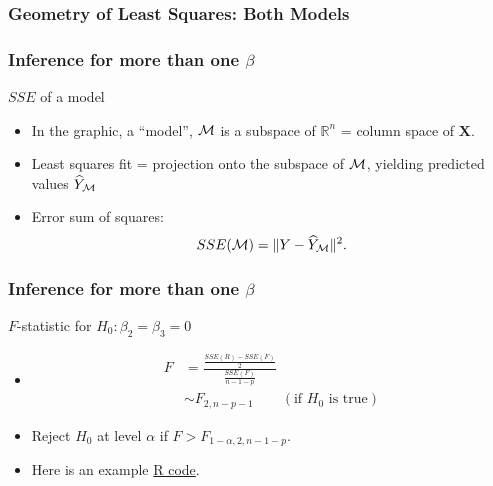 \documentclass[handout]{beamer}
\begin{document}

   \begin{frame} \frametitle{Geometry of Least Squares: Both Models}

   \end{frame}


   \begin{frame} \frametitle{Inference for more than one $\beta$}

   \begin{block}
   {$SSE$ of a model}
   \begin{itemize}[<+->]
   \item In the graphic, a ``model'', ${\cal M}$ is a subspace of $\mathbb{R}^n$ = column space of $\pmb{X}$.


   \item Least squares fit = projection onto the subspace of ${\cal M}$,
   yielding predicted values $\widehat{Y}_{{\cal M}}$

   \item Error sum of squares:
   $$
   SSE({\cal M}) = \|Y - \widehat{Y}_{{\cal M}}\|^2.
   $$
   \end{itemize}
   \end{block}
   \end{frame}


   \begin{frame} \frametitle{Inference for more than one $\beta$}

   \begin{block}
   {$F$-statistic for $H_0:\beta_2=\beta_3=0$}
   \begin{itemize}
   \item
   \begin{equation}
   \begin{aligned}
   F &=\frac{\frac{SSE(R) - SSE(F)}{2}}{\frac{SSE(F)}{n-1-p}} \\
   & \sim F_{2, n-p-1}       \qquad   (\text{if $H_0$ is true})
   \end{aligned}
   \end{equation}
   \item Reject $H_0$ at level $\alpha$ if $F > F_{1-\alpha, 2, n-1-p}$.

   \item Here is an example \href{http://stats191.stanford.edu/multiple.html}{R code}.
   \end{itemize}
   \end{block}
   \end{frame}
\end{document}
